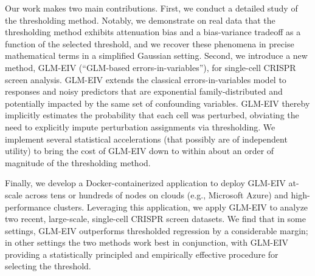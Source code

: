\documentclass[12pt]{article}
\begin{document}
Our work makes two main contributions. First, we conduct a detailed study of the thresholding method. Notably, we demonstrate on real data that the thresholding method exhibits attenuation bias and a bias-variance tradeoff as a function of the selected threshold, and we recover these phenomena in precise mathematical terms in a simplified Gaussian setting. Second, we introduce a new method, GLM-EIV (``GLM-based errors-in-variables''), for single-cell CRISPR screen analysis. GLM-EIV extends the classical errors-in-variables model \parencite{carroll} to responses and noisy predictors that are exponential family-distributed and potentially impacted by the same set of confounding variables. GLM-EIV thereby implicitly estimates the probability that each cell was perturbed, obviating the need to explicitly impute perturbation assignments via thresholding. We implement several statistical accelerations (that possibly are of independent utility) to bring the cost of GLM-EIV down to within about an order of magnitude of the thresholding method.

Finally, we develop a Docker-containerized application to deploy GLM-EIV at-scale across tens or hundreds of nodes on clouds (e.g., Microsoft Azure) and high-performance clusters. Leveraging this application, we apply GLM-EIV to analyze two recent, large-scale, single-cell CRISPR screen datasets. We find that in some settings, GLM-EIV outperforms thresholded regression by a considerable margin; in other settings the two methods work best in conjunction, with GLM-EIV providing a statistically principled and empirically effective procedure for selecting the threshold.
\end{document}
